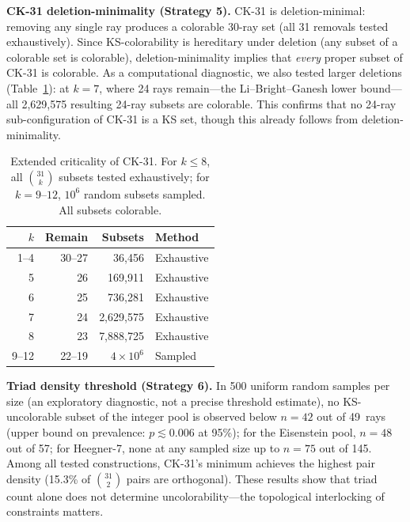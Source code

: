 \documentclass[twocolumn,prl,superscriptaddress,nofootinbib]{revtex4-2}
\begin{document}
\textbf{CK-31 deletion-minimality (Strategy 5).} CK-31 is deletion-minimal: removing any single ray produces a colorable 30-ray set (all 31 removals tested exhaustively).  Since KS-colorability is hereditary under deletion (any subset of a colorable set is colorable), deletion-minimality implies that \emph{every} proper subset of CK-31 is colorable.  As a computational diagnostic, we also tested larger deletions (Table~\ref{tab:criticality}): at $k = 7$, where 24 rays remain---the Li--Bright--Ganesh lower bound---all 2,629,575 resulting 24-ray subsets are colorable.  This confirms that no 24-ray sub-configuration of CK-31 is a KS set, though this already follows from deletion-minimality.

\begin{table}[b]
\centering
\caption{Extended criticality of CK-31. For $k \leq 8$, all $\binom{31}{k}$ subsets tested exhaustively; for $k = 9$--$12$, $10^6$ random subsets sampled. All subsets colorable.}
\label{tab:criticality}
\begin{tabular}{rrrl}
\toprule
$k$ & Remain & Subsets & Method \\
\midrule
1--4 & 30--27 & 36,456 & Exhaustive \\
5 & 26 & 169,911 & Exhaustive \\
6 & 25 & 736,281 & Exhaustive \\
7 & 24 & 2,629,575 & Exhaustive \\
8 & 23 & 7,888,725 & Exhaustive \\
9--12 & 22--19 & $4 \times 10^6$ & Sampled \\
\bottomrule
\end{tabular}
\end{table}

\textbf{Triad density threshold (Strategy 6).} In 500 uniform random samples per size (an exploratory diagnostic, not a precise threshold estimate), no KS-uncolorable subset of the integer pool is observed below $n = 42$ out of 49~rays (upper bound on prevalence: $p \lesssim 0.006$ at 95\%); for the Eisenstein pool, $n = 48$ out of 57; for Heegner-7, none at any sampled size up to $n = 75$ out of 145. Among all tested constructions, CK-31's minimum achieves the highest pair density (15.3\% of $\binom{31}{2}$ pairs are orthogonal). These results show that triad count alone does not determine uncolorability---the topological interlocking of constraints matters.
\end{document}
